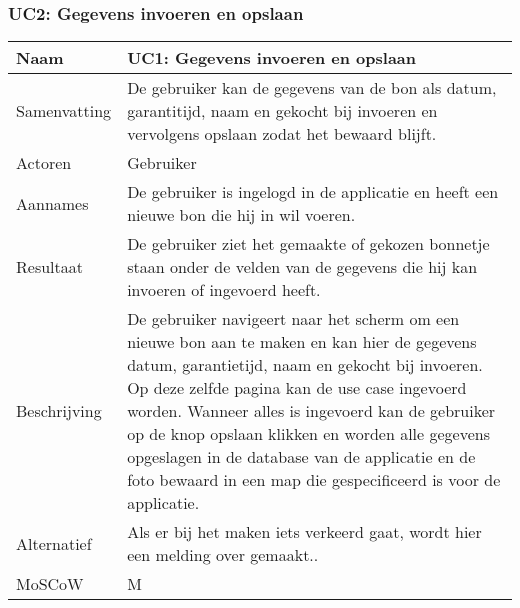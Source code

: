 \documentclass[a4paper,11pt,oneside]{report}
\begin{document}
\subsubsection{UC2: Gegevens invoeren en opslaan} %
\label{ssub:gegevens_invoeren_en_opslaan}
\begin{tabularx}{\linewidth}{| g | X |}
  \hline
  Naam      & UC1: Gegevens invoeren en opslaan \\ \hline
  Samenvatting  &  De gebruiker kan de gegevens van de bon als datum,
garantitijd, naam en gekocht bij invoeren en vervolgens opslaan zodat het
bewaard blijft. \\ \hline
  Actoren     & Gebruiker \\ \hline
  Aannames    & De gebruiker is ingelogd in de applicatie en heeft een nieuwe
bon die hij in wil voeren. \\ \hline
  Resultaat     & De gebruiker ziet het gemaakte of gekozen bonnetje staan onder
de velden van de gegevens die hij kan invoeren of ingevoerd heeft.
\\ \hline
  Beschrijving  &  De gebruiker navigeert naar het scherm om een nieuwe bon aan
te maken en kan hier de gegevens datum, garantietijd, naam en gekocht bij
invoeren. Op deze zelfde pagina kan de use case
 ingevoerd worden. Wanneer alles is
ingevoerd kan de gebruiker op de knop opslaan klikken en worden alle gegevens
opgeslagen in de database van de applicatie en de foto bewaard in een map die
gespecificeerd is voor de applicatie.\\ \hline
  Alternatief   & Als er bij het maken iets verkeerd gaat, wordt hier een
melding over gemaakt.. \\ \hline
MoSCoW & M \\ \hline
\end{tabularx}
\end{document}
